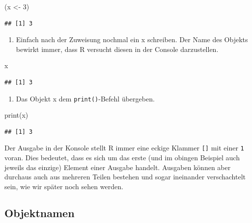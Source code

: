\documentclass[
]{book}
\newenvironment{Shaded}{\begin{snugshade}}{\end{snugshade}}
\newcommand{\DecValTok}[1]{\textcolor[rgb]{0.00,0.00,0.81}{#1}}
\newcommand{\FunctionTok}[1]{\textcolor[rgb]{0.00,0.00,0.00}{#1}}
\newcommand{\NormalTok}[1]{#1}
\newcommand{\OtherTok}[1]{\textcolor[rgb]{0.56,0.35,0.01}{#1}}
\providecommand{\tightlist}{%
  \setlength{\itemsep}{0pt}\setlength{\parskip}{0pt}}
\begin{document}
\begin{Shaded}
\begin{Highlighting}[]
\NormalTok{(x }\OtherTok{\textless{}{-}} \DecValTok{3}\NormalTok{)}
\end{Highlighting}
\end{Shaded}

\begin{verbatim}
## [1] 3
\end{verbatim}

\begin{enumerate}
\def\labelenumi{\arabic{enumi}.}
\setcounter{enumi}{1}
\tightlist
\item
  Einfach nach der Zuweisung nochmal ein x schreiben. Der Name des Objekts bewirkt immer, dass R versucht diesen in der Console darzustellen.
\end{enumerate}

\begin{Shaded}
\begin{Highlighting}[]
\NormalTok{x}
\end{Highlighting}
\end{Shaded}

\begin{verbatim}
## [1] 3
\end{verbatim}

\begin{enumerate}
\def\labelenumi{\arabic{enumi}.}
\setcounter{enumi}{2}
\tightlist
\item
  Das Objekt x dem \texttt{print()}-Befehl übergeben.
\end{enumerate}

\begin{Shaded}
\begin{Highlighting}[]
\FunctionTok{print}\NormalTok{(x)}
\end{Highlighting}
\end{Shaded}

\begin{verbatim}
## [1] 3
\end{verbatim}

Der Ausgabe in der Konsole stellt R immer eine eckige Klammer \texttt{{[}{]}} mit einer \texttt{1} voran. Dies bedeutet, dass es sich um das erste (und im obingen Beispiel auch jeweils das einzige) Element einer Ausgabe handelt. Ausgaben können aber durchaus auch aus mehreren Teilen bestehen und sogar ineinander verschachtelt sein, wie wir später noch sehen werden.

\hypertarget{objektnamen}{%
\subsection{Objektnamen}\label{objektnamen}}
\end{document}
